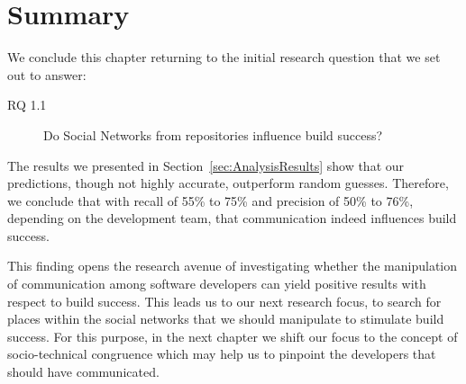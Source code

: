 \section{Summary}
\label{sec:conclusion}
We conclude this chapter returning to the initial research question that we set out to answer:
\begin{description}
\item[RQ 1.1] Do Social Networks from repositories influence build success?
\end{description}

The results we presented in Section~\ref{sec:AnalysisResults} show that our predictions, though not highly accurate, outperform random guesses.
Therefore, we conclude that with recall of 55\% to 75\% and precision of 50\% to 76\%, depending on the development team, that communication indeed influences build success.

This finding opens the research avenue of investigating whether the manipulation of communication among software developers can yield positive results with respect to build success.
This leads us to our next research focus, to search for places within the social networks that we should manipulate to stimulate build success.
For this purpose, in the next chapter we shift our focus to the concept of socio-technical congruence which may help us to pinpoint the developers that should have communicated.

